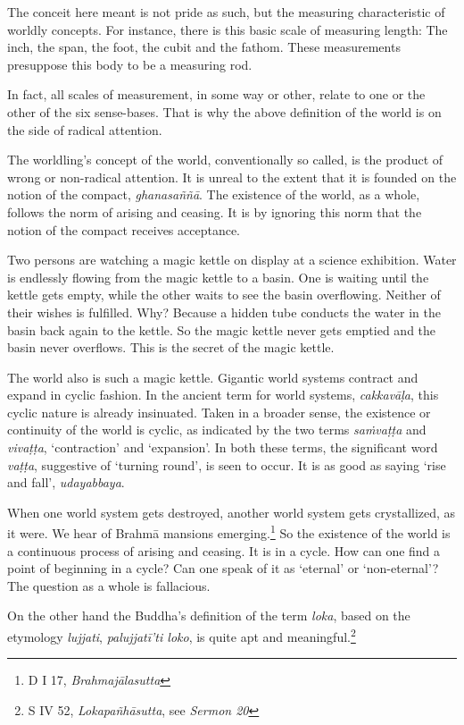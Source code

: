 The conceit here meant is not pride as such, but the measuring characteristic of worldly concepts. For instance, there is this basic scale of measuring length: The inch, the span, the foot, the cubit and the fathom. These measurements presuppose this body to be a measuring rod.

In fact, all scales of measurement, in some way or other, relate to one or the other of the six sense-bases. That is why the above definition of the world is on the side of radical attention.

The worldling's concept of the world, conventionally so called, is the product of wrong or non-radical attention. It is unreal to the extent that it is founded on the notion of the compact, \emph{ghanasaññā}. The existence of the world, as a whole, follows the norm of arising and ceasing. It is by ignoring this norm that the notion of the compact receives acceptance.

Two persons are watching a magic kettle on display at a science exhibition. Water is endlessly flowing from the magic kettle to a basin. One is waiting until the kettle gets empty, while the other waits to see the basin overflowing. Neither of their wishes is fulfilled. Why? Because a hidden tube conducts the water in the basin back again to the kettle. So the magic kettle never gets emptied and the basin never overflows. This is the secret of the magic kettle.

The world also is such a magic kettle. Gigantic world systems contract and expand in cyclic fashion. In the ancient term for world systems, \emph{cakkavāḷa}, this cyclic nature is already insinuated. Taken in a broader sense, the existence or continuity of the world is cyclic, as indicated by the two terms \emph{saṁvaṭṭa} and \emph{vivaṭṭa}, `contraction' and `expansion'. In both these terms, the significant word \emph{vaṭṭa}, suggestive of `turning round', is seen to occur. It is as good as saying `rise and fall', \emph{udayabbaya}.

When one world system gets destroyed, another world system gets crystallized, as it were. We hear of Brahmā mansions emerging.\footnote{D I 17, \emph{Brahmajālasutta}} So the existence of the world is a continuous process of arising and ceasing. It is in a cycle. How can one find a point of beginning in a cycle? Can one speak of it as `eternal' or `non-eternal'? The question as a whole is fallacious.

On the other hand the Buddha's definition of the term \emph{loka}, based on the etymology \emph{lujjati}, \emph{palujjatī'ti loko}, is quite apt and meaningful.\footnote{S IV 52, \emph{Lokapañhāsutta}, see \emph{Sermon 20}}

